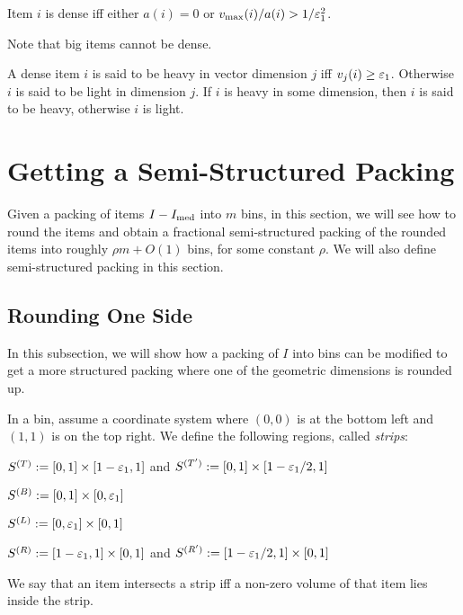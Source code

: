 \begin{definition}
Item $i$ is dense iff either $a(i) = 0$ or $v_{\max}(i)/a(i) > 1/\varepsilon_1^2$.
\end{definition}
Note that big items cannot be dense.
\begin{definition}
\label{defn:heavy-light}
A dense item $i$ is said to be heavy in vector dimension $j$ iff $v_j(i) \ge \varepsilon_1$.
Otherwise $i$ is said to be light in dimension $j$.
If $i$ is heavy in some dimension, then $i$ is said to be heavy, otherwise $i$ is light.
\end{definition}

\section{Getting a Semi-Structured Packing}
\label{sec:gv-rbbp:semi-struct}

Given a packing of items $I - I_{\mathrm{med}}$ into $m$ bins, in this section, we will see how to
round the items and obtain a fractional semi-structured packing of the rounded items
into roughly $\rho m + O(1)$ bins, for some constant $\rho$.
We will also define semi-structured packing in this section.

\subsection{Rounding One Side}
\label{sec:gv-rbbp:one-side}

In this subsection, we will show how a packing of $I$ into bins can be modified
to get a more structured packing where one of the geometric dimensions is rounded up.

\begin{definition}
In a bin, assume a coordinate system where $(0, 0)$ is at the bottom left
and $(1, 1)$ is on the top right. We define the following regions, called \emph{strips}:
\begin{tightemize}
\item $S^{(T)} := [0, 1] \times [1-\varepsilon_1, 1]$
    and $S^{(T')} := [0, 1] \times [1-\varepsilon_1/2, 1]$
\item $S^{(B)} := [0, 1] \times [0, \varepsilon_1]$
\item $S^{(L)} := [0, \varepsilon_1] \times [0, 1]$
\item $S^{(R)} := [1-\varepsilon_1, 1] \times [0, 1]$
    and $S^{(R')} := [1-\varepsilon_1/2, 1] \times [0, 1]$
\end{tightemize}
We say that an item intersects a strip iff a non-zero volume of that item lies inside the strip.
\end{definition}

